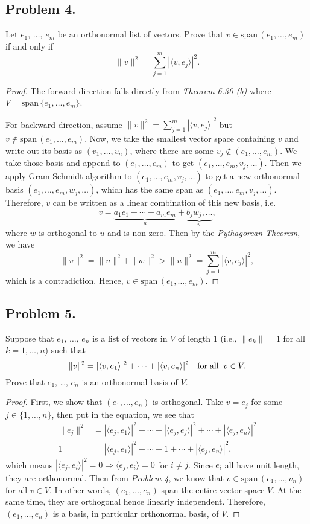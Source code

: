 \documentclass{article}
\newcommand*{\spann}{\ensuremath{\mathrm{span}}\,}
\renewcommand*{\implies}{\ensuremath{\Longrightarrow}}
\begin{document}
\newpage
\subsection*{Problem 4.}
Let $e_1$, $\ldots$, $e_m$ be an orthonormal list of vectors. Prove that
$v\in \spann (e_1,\ldots, e_m)$ if and only if
$$ \| v\|^2 = \sum_{j=1}^m |\langle v, e_j\rangle |^2.$$
\begin{proof}
    The forward direction falls directly from \emph{Theorem 6.30 (b)} where
    $V=\spann\{e_1,\dots, e_m\}$. 
    
    For backward direction, assume 
    $\| v\|^2 = \sum_{j=1}^m |\langle v, e_j\rangle |^2$ but $v\not\in\spann(e_1,\dots,e_m)$. Now, we 
    take the smallest vector space containing $v$ and write out its basis as $(v_1, \dots, v_n)$, where
    there are some $v_j\not\in(e_1,\dots, e_m)$. We take those basis and append to 
    $(e_1,\dots, e_m)$ to get $(e_1,\dots, e_m, v_j,\dots)$.
    Then we apply Gram-Schmidt algorithm to $(e_1,\dots, e_m, v_j,\dots)$ to get a new orthonormal 
    basis $(e_1,\dots, e_m, w_j,\dots)$, which has the same span as $(e_1,\dots, e_m, v_j,\dots)$. 
    Therefore, $v$ can be written as a linear combination of this new basis, i.e.
    $$v = \underbrace{a_1e_1 + \cdots + a_m e_m}_u + \underbrace{b_jw_j,\dots}_w,$$
    where $w$ is orthogonal to $u$ and is non-zero. Then by the \emph{Pythagorean Theorem}, we have
    $$\|v\|^2 = \|u\|^2 + \|w\|^2 > \|u\|^2 = \sum_{j=1}^m |\langle v, e_j\rangle |^2,$$
    which is a contradiction. Hence, $v\in\spann(e_1,\dots, e_m)$.
\end{proof}

\newpage
\subsection*{Problem 5.}
Suppose that $e_1$, $\ldots$, $e_n$ is a list of vectors in $V$ of length $1$ (i.e., $\|e_k\|=1$
for all $k=1,\ldots, n$) such that
$$\|v\|^2=|\langle v,e_1\rangle |^2+\cdots + |\langle v, e_n  \rangle|^2 \quad  {\rm for \; all} \;\; v\in V.$$
Prove that $e_1$, \ldots, $e_n$ is an orthonormal basis of $V$.
\begin{proof}
    First, we show that $(e_1,\dots, e_n)$ is orthogonal. Take $v=e_j$ for some $j\in\{1,\dots, n\}$, 
    then put in the equation, we see that
    \begin{align*}
        \|e_j\|^2 & = |\langle e_j, e_1\rangle|^2 + \cdots + |\langle e_j, e_j\rangle|^2
        +\cdots + |\langle e_j, e_n\rangle|^2 \\
        1 & = |\langle e_j, e_1\rangle|^2 + \cdots + 1
        +\cdots + |\langle e_j, e_n\rangle|^2,
    \end{align*} which means $|\langle e_j, e_i\rangle|^2 = 0 \implies \langle e_j, e_i\rangle=0$ for $i\neq j$.
    Since $e_i$ all have unit length, they are orthonormal. Then from \emph{Problem 4}, we know that
    $v\in\spann(e_1,\dots,v_n)$ for all $v\in V$. In other words, $(e_1,\dots, e_n)$ span the entire 
    vector space $V$. At the same time, they are orthogonal hence linearly independent. Therefore,
    $(e_1,\dots, e_n)$ is a basis, in particular orthonormal basis, of $V$.
\end{proof}
\end{document}

